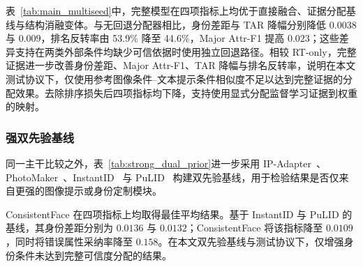 \documentclass[journal]{IEEEtran}
\begin{document}
表~\ref{tab:main_multiseed}中，完整模型在四项指标上均优于直接融合、证据分配基线与结构消融变体。与无回退分配器相比，身份差距与 TAR 降幅分别降低 $0.0038$ 与 $0.009$，排名反转率由 53.9\% 降至 44.6\%，Major Attr-F1 提高 $0.023$；这些差异支持在两类外部条件均缺少可信依据时使用独立回退路径。相较 RT-only，完整证据进一步改善身份差距、Major Attr-F1、TAR 降幅与排名反转率，说明在本文测试协议下，仅使用参考图像条件--文本提示条件相似度不足以达到完整证据的分配效果。去除排序损失后四项指标均下降，支持使用显式分配监督学习证据到权重的映射。

\subsubsection{强双先验基线}
同一主干比较之外，表~\ref{tab:strong_dual_prior}进一步采用 IP-Adapter~\cite{ye2023ipadapter}、PhotoMaker~\cite{li2024photomaker}、InstantID~\cite{wang2024instantid} 与 PuLID~\cite{guo2024pulid} 构建双先验基线，用于检验结果是否仅来自更强的图像提示或身份定制模块。

\begin{table}[!t]
\centering
\caption{强双先验基线的定量比较。ConsistentFace 行复用表~\ref{tab:main_multiseed}的五种子均值。}
\label{tab:strong_dual_prior}
{\scriptsize
\renewcommand{\arraystretch}{0.92}
\setlength{\tabcolsep}{1mm}
}
\end{table}

ConsistentFace 在四项指标上均取得最佳平均结果。基于 InstantID 与 PuLID 的基线，其身份差距分别为 $0.0136$ 与 $0.0132$；ConsistentFace 将该指标降至 $0.0109$，同时将错误属性采纳率降至 $0.158$。在本文双先验基线与测试协议下，仅增强身份条件未达到完整可信度分配的结果。
\end{document}
